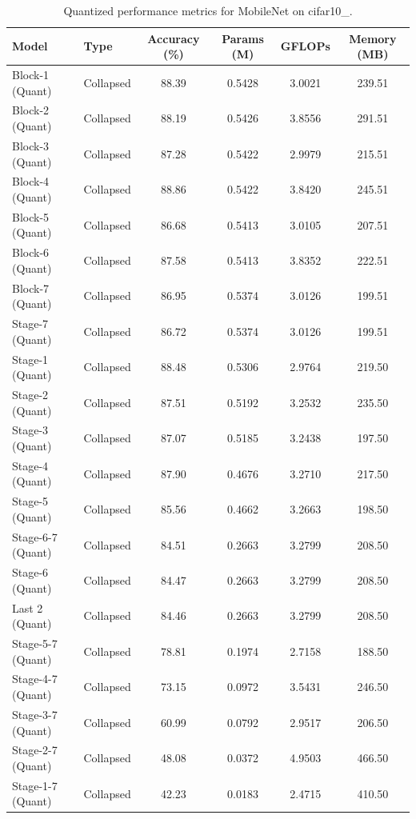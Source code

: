 \begin{table}
\caption{Quantized performance metrics for MobileNet on cifar10_.}
\label{tab:MobileNet_cifar10__quant}
\begin{tabular}{llcccc}
\toprule
Model & Type & Accuracy (\%) & Params (M) & GFLOPs & Memory (MB) \\
\midrule
Block-1
(Quant) & Collapsed & 88.39 & 0.5428 & 3.0021 & 239.51 \\
Block-2
(Quant) & Collapsed & 88.19 & 0.5426 & 3.8556 & 291.51 \\
Block-3
(Quant) & Collapsed & 87.28 & 0.5422 & 2.9979 & 215.51 \\
Block-4
(Quant) & Collapsed & 88.86 & 0.5422 & 3.8420 & 245.51 \\
Block-5
(Quant) & Collapsed & 86.68 & 0.5413 & 3.0105 & 207.51 \\
Block-6
(Quant) & Collapsed & 87.58 & 0.5413 & 3.8352 & 222.51 \\
Block-7
(Quant) & Collapsed & 86.95 & 0.5374 & 3.0126 & 199.51 \\
Stage-7
(Quant) & Collapsed & 86.72 & 0.5374 & 3.0126 & 199.51 \\
Stage-1
(Quant) & Collapsed & 88.48 & 0.5306 & 2.9764 & 219.50 \\
Stage-2
(Quant) & Collapsed & 87.51 & 0.5192 & 3.2532 & 235.50 \\
Stage-3
(Quant) & Collapsed & 87.07 & 0.5185 & 3.2438 & 197.50 \\
Stage-4
(Quant) & Collapsed & 87.90 & 0.4676 & 3.2710 & 217.50 \\
Stage-5
(Quant) & Collapsed & 85.56 & 0.4662 & 3.2663 & 198.50 \\
Stage-6-7
(Quant) & Collapsed & 84.51 & 0.2663 & 3.2799 & 208.50 \\
Stage-6
(Quant) & Collapsed & 84.47 & 0.2663 & 3.2799 & 208.50 \\
Last 2
(Quant) & Collapsed & 84.46 & 0.2663 & 3.2799 & 208.50 \\
Stage-5-7
(Quant) & Collapsed & 78.81 & 0.1974 & 2.7158 & 188.50 \\
Stage-4-7
(Quant) & Collapsed & 73.15 & 0.0972 & 3.5431 & 246.50 \\
Stage-3-7
(Quant) & Collapsed & 60.99 & 0.0792 & 2.9517 & 206.50 \\
Stage-2-7
(Quant) & Collapsed & 48.08 & 0.0372 & 4.9503 & 466.50 \\
Stage-1-7
(Quant) & Collapsed & 42.23 & 0.0183 & 2.4715 & 410.50 \\
\bottomrule
\end{tabular}
\end{table}
